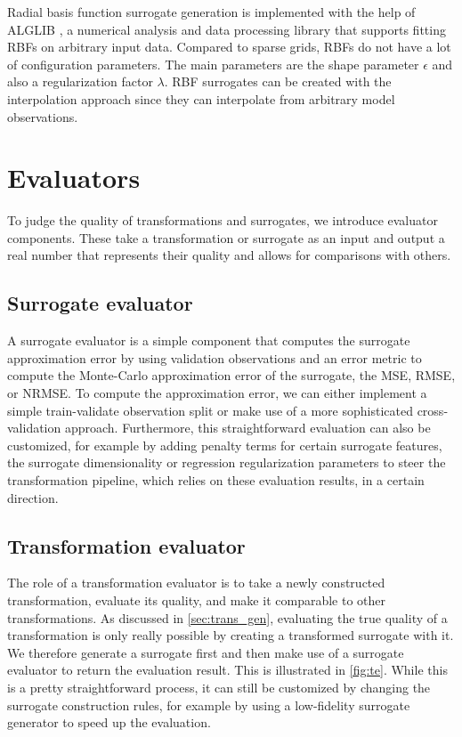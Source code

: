 \documentclass[
  a4paper,  %
  twoside,  %
  bibliography=totoc,
  headsepline,
  cleardoublepage=empty,
  parskip=half,
  draft=false
]{scrbook}
\begin{document}
Radial basis function surrogate generation is implemented with the help of ALGLIB \cite{Bochkanov}, a numerical analysis and data processing library that supports fitting RBFs on arbitrary input data.
Compared to sparse grids, RBFs do not have a lot of configuration parameters.
The main parameters are the shape parameter $\epsilon$ and also a regularization factor $\lambda$.
RBF surrogates can be created with the interpolation approach since they can interpolate from arbitrary model observations.

\section {Evaluators}

To judge the quality of transformations and surrogates, we introduce evaluator components.
These take a transformation or surrogate as an input and output a real number that represents their quality and allows for comparisons with others.

\subsection {Surrogate evaluator}
\label{sec:se}

A surrogate evaluator is a simple component that computes the surrogate approximation error by using validation observations and an error metric to compute the Monte-Carlo approximation error of the surrogate, \eg the MSE, RMSE, or NRMSE.
To compute the approximation error, we can either implement a simple train-validate observation split or make use of a more sophisticated cross-validation approach.
Furthermore, this straightforward evaluation can also be customized, for example by adding penalty terms for certain surrogate features, \eg the surrogate dimensionality or regression regularization parameters to steer the transformation pipeline, which relies on these evaluation results, in a certain direction.

\newpage
\subsection {Transformation evaluator}
\label{sec:te}

The role of a transformation evaluator is to take a newly constructed transformation, evaluate its quality, and make it comparable to other transformations.
As discussed in \cref{sec:trans_gen}, evaluating the true quality of a transformation is only really possible by creating a transformed surrogate with it.
We therefore generate a surrogate first and then make use of a surrogate evaluator to return the evaluation result.
This is illustrated in \cref{fig:te}.
While this is a pretty straightforward process, it can still be customized by changing the surrogate construction rules, for example by using a low-fidelity surrogate generator to speed up the evaluation.
\end{document}
